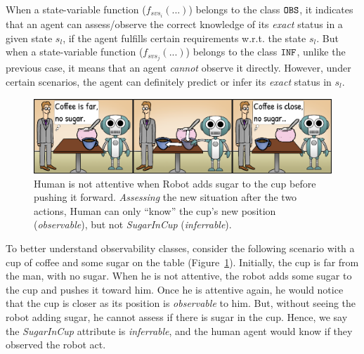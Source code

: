 \documentclass[letterpaper]{article} %
\begin{document}
When a state-variable function ($f_{svs_i}(...)$) belongs to the class $\texttt{OBS}$, it indicates that an agent can assess/observe the correct knowledge of its \textit{exact} status in a given state $s_l$, if the agent fulfills certain requirements w.r.t. the state $s_l$. 
But when a state-variable function ($f_{svs_j}(...)$) belongs to the class $\texttt{INF}$, unlike the previous case, it means that an agent \textit{cannot} observe it directly. However, under certain scenarios, the agent can definitely predict or infer its \textit{exact} status in $s_l$. 

\begin{figure}
    \centering
    \includegraphics[width=0.9\linewidth]{figures/cartoon_inf_obs_bigger.png}
    \caption{
    Human is not attentive when Robot adds sugar to the cup before pushing it forward. \textit{Assessing} the new situation after the two actions, Human can only ``know'' the cup's new position (\textit{observable}), but not \textit{SugarInCup} (\textit{inferrable}).
    }
    \label{fig:obs_attr}
\end{figure}


To better understand observability classes, consider the following scenario with a cup of coffee and some sugar on the table (Figure~\ref{fig:obs_attr}). 
Initially, the cup is far from the man, with no sugar. When he is not attentive, the robot adds some sugar to the cup and pushes it toward him. 
Once he is attentive again, he would notice that the cup is closer as its position is \textit{observable} to him.
But, without seeing the robot adding sugar, he cannot assess if there is sugar in the cup. Hence, we say the \textit{SugarInCup} attribute is \textit{inferrable}, 
and the human agent would know if they observed the robot act.
\end{document}
